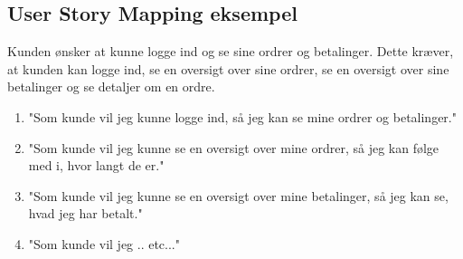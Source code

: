 \subsection{User Story Mapping eksempel}
Kunden ønsker at kunne logge ind og se sine ordrer og betalinger. Dette kræver, at kunden kan logge ind, se en oversigt over sine ordrer, se en oversigt over sine betalinger og se detaljer om en ordre.
\begin{enumerate}
    \item "Som kunde vil jeg kunne logge ind, så jeg kan se mine ordrer og betalinger."
    \item "Som kunde vil jeg kunne se en oversigt over mine ordrer, så jeg kan følge med i, hvor langt de er."
    \item "Som kunde vil jeg kunne se en oversigt over mine betalinger, så jeg kan se, hvad jeg har betalt."
    \item "Som kunde vil jeg .. etc..."
    \label{item:user-story-mapping-eksempel}
\end{enumerate}

